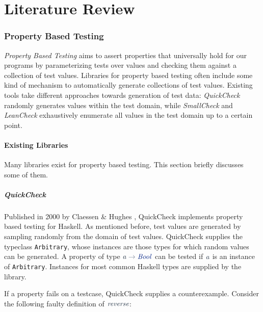 \documentclass[a4paper,msc,twosized=semi]{uustthesis}
\newcommand*{\mathcolor}{}
\def\mathcolor#1#{\mathcoloraux{#1}}
\newcommand*{\mathcoloraux}[3]{%
  \protect\leavevmode
  \begingroup
    \color#1{#2}#3%
  \endgroup
}
\newcommand{\HSSym}[1]{\mathcolor{hsblue4}{#1}}
\newcommand{\HSCon}[1]{\mathcolor{hsblue3}{\mathit{#1}}}
\newcommand{\HSVar}[1]{\mathcolor{hsblue5}{\mathit{#1}}}
\begin{document}
\chapter{Literature Review}
  \subsection{Property Based Testing}

    \textit{Property Based Testing} aims to assert properties that universally hold for our programs by parameterizing tests over values and checking them against a collection of test values. Libraries for property based testing often include some kind of mechanism to automatically generate collections of test values. Existing tools take different approaches towards generation of test data: \textit{QuickCheck} \cite{claessen2011quickcheck} randomly generates values within the test domain, while \textit{SmallCheck} \cite{runciman2008smallcheck} and \textit{LeanCheck} \cite{matela2017tools} exhaustively enumerate all values in the test domain up to a certain point. 

  \subsubsection{Existing Libraries}

    Many libraries exist for property based testing. This section briefly discusses some of them. 

    \paragraph{QuickCheck} Published in 2000 by Claessen \& Hughes \cite{claessen2011quickcheck}, QuickCheck implements property based testing for Haskell. As mentioned before, test values are generated by sampling randomly from the domain of test values. QuickCheck supplies the typeclass \texttt{Arbitrary}, whose instances are those types for which random values can be generated. A property of type \ensuremath{\HSVar{a}\HSSym{\to} \HSCon{Bool}} can be tested if \ensuremath{\HSVar{a}} is an instance of \texttt{Arbitrary}. Instances for most common Haskell types are supplied by the library. 

    If a property fails on a testcase, QuickCheck supplies a counterexample. Consider the following faulty definition of \ensuremath{\HSVar{reverse}}: 
\end{document}
